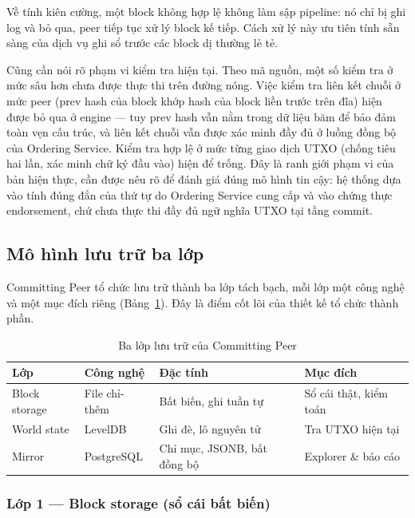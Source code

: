 Về tính kiên cường, một block không hợp lệ không làm sập pipeline: nó chỉ bị
ghi log và bỏ qua, peer tiếp tục xử lý block kế tiếp. Cách xử lý này ưu tiên
tính sẵn sàng của dịch vụ ghi sổ trước các block dị thường lẻ tẻ.

Cũng cần nói rõ phạm vi kiểm tra hiện tại. Theo mã nguồn, một số kiểm tra ở
mức sâu hơn chưa được thực thi trên đường nóng. Việc kiểm tra liên kết chuỗi
ở mức peer (prev hash của block khớp hash của block liền trước trên đĩa)
hiện được bỏ qua ở engine --- tuy prev hash vẫn nằm trong dữ liệu băm để bảo
đảm toàn vẹn cấu trúc, và liên kết chuỗi vẫn được xác minh đầy đủ ở luồng
đồng bộ của Ordering Service. Kiểm tra hợp lệ ở mức từng giao dịch UTXO
(chống tiêu hai lần, xác minh chữ ký đầu vào) hiện để trống. Đây là ranh giới
phạm vi của bản hiện thực, cần được nêu rõ để đánh giá đúng mô hình tin cậy:
hệ thống dựa vào tính đúng đắn của thứ tự do Ordering Service cung cấp và vào
chứng thực endorsement, chứ chưa thực thi đầy đủ ngữ nghĩa UTXO tại tầng
commit.

\subsection{Mô hình lưu trữ ba lớp}
\label{sec:cp-storage}

Committing Peer tổ chức lưu trữ thành ba lớp tách bạch, mỗi lớp một công nghệ
và một mục đích riêng (Bảng~\ref{tab:storage-layers}). Đây là điểm cốt lõi
của thiết kế tổ chức thành phần.

\begin{table}[H]
\centering
\caption{Ba lớp lưu trữ của Committing Peer}
\label{tab:storage-layers}
\begin{tabular}{@{}p{2.6cm}p{2.8cm}p{4cm}p{2.6cm}@{}}
\toprule
Lớp & Công nghệ & Đặc tính & Mục đích \\
\midrule
Block storage & File chỉ-thêm & Bất biến, ghi tuần tự & Sổ cái thật, kiểm toán \\
World state & LevelDB & Ghi đè, lô nguyên tử & Tra UTXO hiện tại \\
Mirror & PostgreSQL & Chỉ mục, JSONB, bất đồng bộ & Explorer \& báo cáo \\
\bottomrule
\end{tabular}
\end{table}

\subsubsection{Lớp 1 --- Block storage (sổ cái bất biến)}

